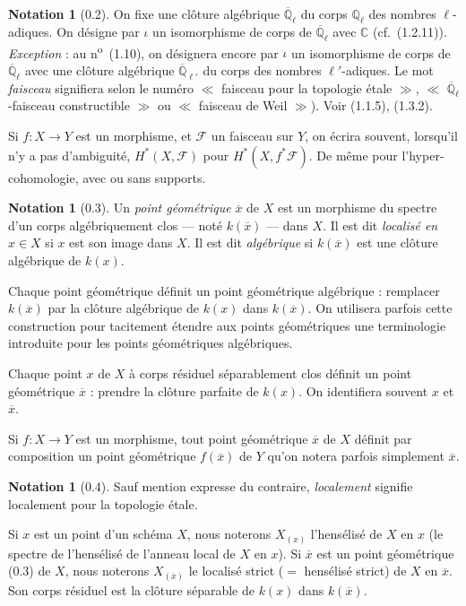 \documentclass[12pt,a4paper]{article}
\theoremstyle{plain}
\theoremstyle{definition}
\newtheorem{notation}[theorem]{Notation}
\theoremstyle{definition}
\theoremstyle{remark}
\begin{document}
\begin{notation}[0.2]
On fixe une cl\^oture alg\'ebrique $\overline{\mathbb{Q}}_\ell$ du corps $\mathbb{Q}_\ell$ des nombres $\ell$-adiques. On d\'esigne par $\iota$ un isomorphisme de corps de $\overline{\mathbb{Q}}_\ell$ avec $\mathbb{C}$ (cf.~(1.2.11)). \emph{Exception} : au n\textsuperscript{o}~(1.10), on d\'esignera encore par $\iota$ un isomorphisme de corps de $\overline{\mathbb{Q}}_\ell$ avec une cl\^oture alg\'ebrique $\overline{\mathbb{Q}}_{\ell'}$ du corps des nombres $\ell'$-adiques. Le mot \emph{faisceau} signifiera selon le num\'ero $\ll$ faisceau pour la topologie \'etale $\gg$, $\ll$ $\overline{\mathbb{Q}}_\ell$-faisceau constructible $\gg$ ou $\ll$ faisceau de Weil $\gg$). Voir (1.1.5), (1.3.2).

Si $f: X \to Y$ est un morphisme, et $\mathscr{F}$ un faisceau sur $Y$, on \'ecrira souvent, lorsqu'il n'y a pas d'ambiguit\'e, $H^*(X, \mathscr{F})$ pour $H^*(X, f^*\mathscr{F})$. De m\^eme pour l'hyper-cohomologie, avec ou sans supports.
\end{notation}

\begin{notation}[0.3]
Un \emph{point g\'eom\'etrique} $\overline{x}$ de $X$ est un morphisme du spectre d'un corps alg\'ebriquement clos --- not\'e $k(\overline{x})$ --- dans $X$. Il est dit \emph{localis\'e en} $x \in X$ si $x$ est son image dans $X$. Il est dit \emph{alg\'ebrique} si $k(\overline{x})$ est une cl\^oture alg\'ebrique de $k(x)$.

Chaque point g\'eom\'etrique d\'efinit un point g\'eom\'etrique alg\'ebrique : remplacer $k(\overline{x})$ par la cl\^oture alg\'ebrique de $k(x)$ dans $k(\overline{x})$. On utilisera parfois cette construction pour tacitement \'etendre aux points g\'eom\'etriques une terminologie introduite pour les points g\'eom\'etriques alg\'ebriques.

Chaque point $x$ de $X$ \`a corps r\'esiduel s\'eparablement clos d\'efinit un point g\'eom\'etrique $\overline{x}$ : prendre la cl\^oture parfaite de $k(x)$. On identifiera souvent $x$ et $\overline{x}$.

Si $f: X \to Y$ est un morphisme, tout point g\'eom\'etrique $\overline{x}$ de $X$ d\'efinit par composition un point g\'eom\'etrique $f(\overline{x})$ de $Y$ qu'on notera parfois simplement $\overline{x}$.
\end{notation}

\begin{notation}[0.4]
Sauf mention expresse du contraire, \emph{localement} signifie localement pour la topologie \'etale.

Si $x$ est un point d'un sch\'ema $X$, nous noterons $X_{(x)}$ l'hens\'elis\'e de $X$ en $x$ (le spectre de l'hens\'elis\'e de l'anneau local de $X$ en $x$). Si $\overline{x}$ est un point g\'eom\'etrique (0.3) de $X$, nous noterons $X_{(\overline{x})}$ le localis\'e strict ($=$ hens\'elis\'e strict) de $X$ en $\overline{x}$. Son corps r\'esiduel est la cl\^oture s\'eparable de $k(x)$ dans $k(\overline{x})$.
\end{notation}
\end{document}
